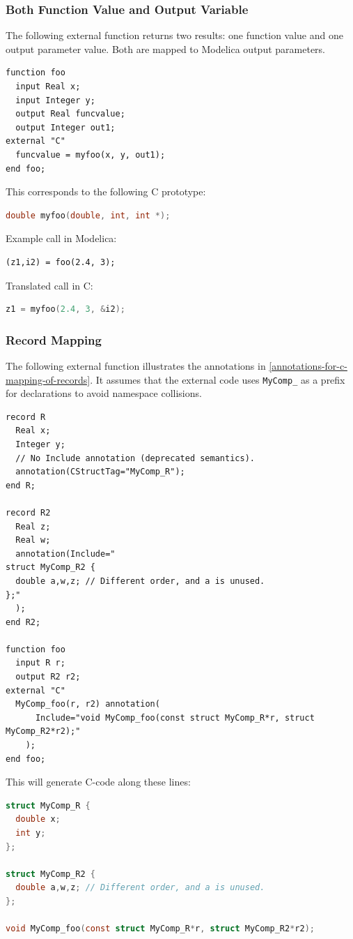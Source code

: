 \subsubsection{Both Function Value and Output Variable}\label{external-function-with-both-function-value-and-output-variable}\label{both-function-value-and-output-variable}

\begin{example}
The following external function returns two results: one function value and one output parameter value.
Both are mapped to Modelica output parameters.
\begin{lstlisting}[language=modelica]
function foo
  input Real x;
  input Integer y;
  output Real funcvalue;
  output Integer out1;
external "C"
  funcvalue = myfoo(x, y, out1);
end foo;
\end{lstlisting}
This corresponds to the following C prototype:
\begin{lstlisting}[language=C]
double myfoo(double, int, int *);
\end{lstlisting}
Example call in Modelica:
\begin{lstlisting}[language=modelica]
(z1,i2) = foo(2.4, 3);
\end{lstlisting}
Translated call in C:
\begin{lstlisting}[language=C]
z1 = myfoo(2.4, 3, &i2);
\end{lstlisting}
\end{example}

\subsubsection{Record Mapping}\label{record-mapping-example}

\begin{example}
The following external function illustrates the annotations in \cref{annotations-for-c-mapping-of-records}.
It assumes that the external code uses \lstinline!MyComp_! as a prefix for declarations to avoid namespace collisions.
\begin{lstlisting}[language=modelica]
record R
  Real x;
  Integer y;
  // No Include annotation (deprecated semantics).
  annotation(CStructTag="MyComp_R");
end R;

record R2
  Real z;
  Real w;
  annotation(Include="
struct MyComp_R2 {
  double a,w,z; // Different order, and a is unused.
};"
  );
end R2;

function foo
  input R r;
  output R2 r2;
external "C"
  MyComp_foo(r, r2) annotation(
      Include="void MyComp_foo(const struct MyComp_R*r, struct MyComp_R2*r2);"
    );
end foo;
\end{lstlisting}
This will generate C-code along these lines:
\begin{lstlisting}[language=C]
struct MyComp_R {
  double x;
  int y;
};

struct MyComp_R2 {
  double a,w,z; // Different order, and a is unused.
};

void MyComp_foo(const struct MyComp_R*r, struct MyComp_R2*r2);
\end{lstlisting}
\end{example}

